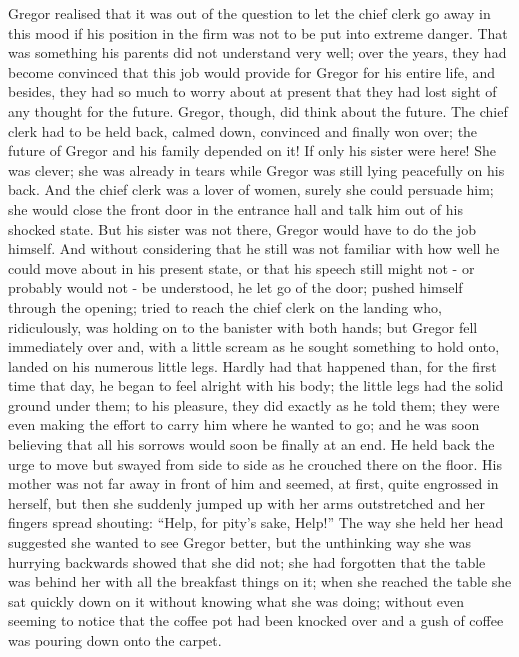 \documentclass[12pt]{report}
\begin{document}
Gregor realised that it was out of the question to let the chief clerk
go away in this mood if his position in the firm was not to be put into
extreme danger. That was something his parents did not understand very
well; over the years, they had become convinced that this job would
provide for Gregor for his entire life, and besides, they had so much to
worry about at present that they had lost sight of any thought for the
future. Gregor, though, did think about the future. The chief clerk had
to be held back, calmed down, convinced and finally won over; the future
of Gregor and his family depended on it! If only his sister were here!
She was clever; she was already in tears while Gregor was still lying
peacefully on his back. And the chief clerk was a lover of women, surely
she could persuade him; she would close the front door in the entrance
hall and talk him out of his shocked state. But his sister was not
there, Gregor would have to do the job himself. And without considering
that he still was not familiar with how well he could move about in his
present state, or that his speech still might not - or probably would
not - be understood, he let go of the door; pushed himself through the
opening; tried to reach the chief clerk on the landing who,
ridiculously, was holding on to the banister with both hands; but Gregor
fell immediately over and, with a little scream as he sought something
to hold onto, landed on his numerous little legs. Hardly had that
happened than, for the first time that day, he began to feel alright
with his body; the little legs had the solid ground under them; to his
pleasure, they did exactly as he told them; they were even making the
effort to carry him where he wanted to go; and he was soon believing
that all his sorrows would soon be finally at an end. He held back the
urge to move but swayed from side to side as he crouched there on the
floor. His mother was not far away in front of him and seemed, at first,
quite engrossed in herself, but then she suddenly jumped up with her
arms outstretched and her fingers spread shouting: ``Help, for pity's
sake, Help!'' The way she held her head suggested she wanted to see
Gregor better, but the unthinking way she was hurrying backwards showed
that she did not; she had forgotten that the table was behind her with
all the breakfast things on it; when she reached the table she sat
quickly down on it without knowing what she was doing; without even
seeming to notice that the coffee pot had been knocked over and a gush
of coffee was pouring down onto the carpet.
\end{document}
